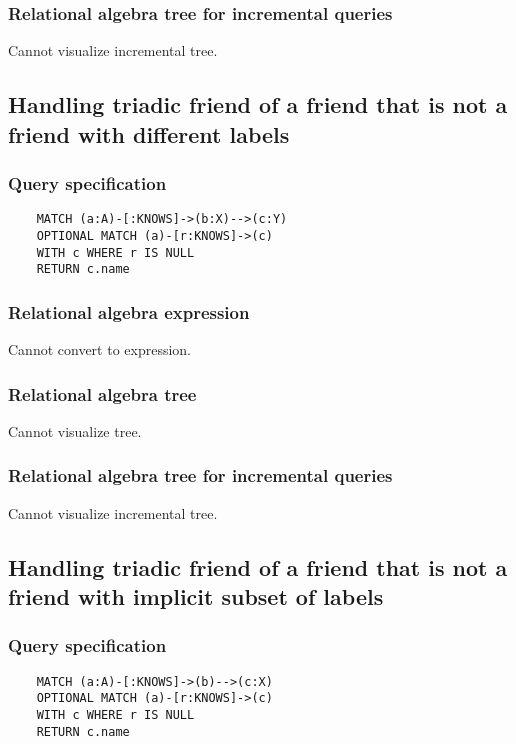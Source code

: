 	\subsubsection*{Relational algebra tree for incremental queries}

	Cannot visualize incremental tree.
	\subsection{Handling triadic friend of a friend that is not a friend with different labels}

	\subsubsection*{Query specification}

	\begin{lstlisting}
	MATCH (a:A)-[:KNOWS]->(b:X)-->(c:Y)
	OPTIONAL MATCH (a)-[r:KNOWS]->(c)
	WITH c WHERE r IS NULL
	RETURN c.name
	\end{lstlisting}


	\subsubsection*{Relational algebra expression}

	Cannot convert to expression.

	\subsubsection*{Relational algebra tree}

	Cannot visualize tree.

	\subsubsection*{Relational algebra tree for incremental queries}

	Cannot visualize incremental tree.
	\subsection{Handling triadic friend of a friend that is not a friend with implicit subset of labels}

	\subsubsection*{Query specification}

	\begin{lstlisting}
	MATCH (a:A)-[:KNOWS]->(b)-->(c:X)
	OPTIONAL MATCH (a)-[r:KNOWS]->(c)
	WITH c WHERE r IS NULL
	RETURN c.name
	\end{lstlisting}


